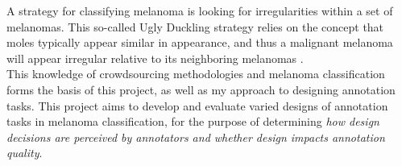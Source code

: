 \documentclass[../report.tex]{subfiles}
\begin{document}
A strategy for classifying melanoma is looking for irregularities within a set of melanomas. This so-called Ugly Duckling strategy relies on the concept that moles typically appear similar in appearance, and thus a malignant melanoma will appear irregular relative to its neighboring melanomas \cite{Halpern2021Warning}. \\

This knowledge of crowdsourcing methodologies and melanoma classification forms the basis of this project, as well as my approach to designing annotation tasks. This project aims to develop and evaluate varied designs of annotation tasks in melanoma classification, for the purpose of determining \textit{how design decisions are perceived by annotators and whether design impacts annotation quality}.
\end{document}
